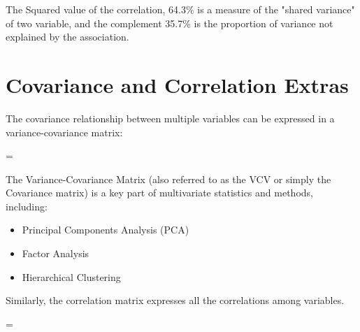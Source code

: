 \documentclass[nohyper,justified]{tufte-handout}\usepackage[]{graphicx}\usepackage[]{color}
\begin{document}
The Squared value of the correlation, 64.3\%  is a measure of the "shared variance" of two variable, and the complement 35.7\% is the proportion of variance not explained by the association.
\newpage
\section{Covariance and Correlation Extras}
The covariance relationship between multiple variables can be expressed in a variance-covariance matrix:

=

The Variance-Covariance Matrix (also referred to as the VCV or simply the Covariance matrix) is a key part of multivariate statistics and methods, including:
\begin{itemize}
  \item Principal Components Analysis (PCA)
  \item Factor Analysis
  \item Hierarchical Clustering
\end{itemize}

Similarly, the correlation matrix expresses all the correlations among variables.

=
\end{document}

